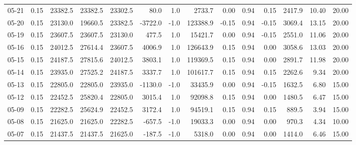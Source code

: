 \begin{threeparttable}
{\begin{tabular}{lrrrrrrrrrrrrr}
  05-21 &     0.15 & 23382.5 & 23382.5 & 23302.5 &       80.0 &                      1.0 &              2733.7 &       0.00 &      0.94 &           0.15 &           2417.9 &           10.40 &                  20.00 \\
  05-20 &     0.15 & 23130.0 & 19660.5 & 23382.5 &    -3722.0 &                     -1.0 &            123388.9 &      -0.15 &      0.94 &          -0.15 &           3069.4 &           13.15 &                  20.00 \\
  05-19 &     0.15 & 23607.5 & 23607.5 & 23130.0 &      477.5 &                      1.0 &             15421.7 &       0.00 &      0.94 &          -0.15 &           2551.0 &           11.06 &                  20.00 \\
  05-16 &     0.15 & 24012.5 & 27614.4 & 23607.5 &     4006.9 &                      1.0 &            126643.9 &       0.15 &      0.94 &           0.00 &           3058.6 &           13.03 &                  20.00 \\
  05-15 &     0.15 & 24187.5 & 27815.6 & 24012.5 &     3803.1 &                      1.0 &            119369.5 &       0.15 &      0.94 &           0.00 &           2891.7 &           11.98 &                  20.00 \\
  05-14 &     0.15 & 23935.0 & 27525.2 & 24187.5 &     3337.7 &                      1.0 &            101617.7 &       0.15 &      0.94 &           0.15 &           2262.6 &            9.34 &                  20.00 \\
  05-13 &     0.15 & 22805.0 & 22805.0 & 23935.0 &    -1130.0 &                     -1.0 &             33435.9 &       0.00 &      0.94 &          -0.15 &           1632.5 &            6.80 &                  15.00 \\
  05-12 &     0.15 & 22452.5 & 25820.4 & 22805.0 &     3015.4 &                      1.0 &             92098.8 &       0.15 &      0.94 &           0.00 &           1480.5 &            6.47 &                  15.00 \\
  05-09 &     0.15 & 22282.5 & 25624.9 & 22452.5 &     3172.4 &                      1.0 &             94519.1 &       0.15 &      0.94 &           0.15 &            889.5 &            3.94 &                  15.00 \\
  05-08 &     0.15 & 21625.0 & 21625.0 & 22282.5 &     -657.5 &                     -1.0 &             19033.3 &       0.00 &      0.94 &           0.00 &            970.3 &            4.34 &                  10.00 \\
  05-07 &     0.15 & 21437.5 & 21437.5 & 21625.0 &     -187.5 &                     -1.0 &              5318.0 &       0.00 &      0.94 &           0.00 &           1414.0 &            6.46 &                  15.00 \\

\end{tabular}}
\end{threeparttable}
